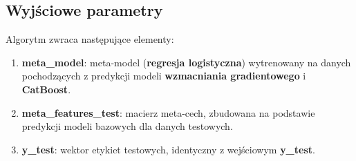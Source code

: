 \subsection{Wyjściowe parametry}
Algorytm zwraca następujące elementy:

\begin{enumerate}
	\def\labelenumi{\arabic{enumi}.}
	\item
	      \textbf{meta\_model}: meta-model (\textbf{regresja logistyczna}) wytrenowany na danych pochodzących z predykcji modeli \textbf{wzmacniania gradientowego} i \textbf{CatBoost}.
	\item
	      \textbf{meta\_features\_test}: macierz meta-cech, zbudowana na podstawie predykcji modeli bazowych dla danych testowych.
	\item
	      \textbf{y\_test}: wektor etykiet testowych, identyczny z wejściowym \textbf{y\_test}.
\end{enumerate}

